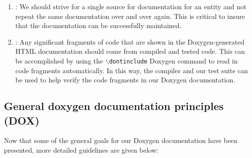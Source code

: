 \begin{enumerate}
{}\item\DOXGDoNotRepeat: We should strive for a single source for
documentation for an entity and not repeat the same documentation over and
over again.  This is critical to insure that the documentation can be
successfully maintained.

{}\item\DOXGDocumentationMaintainItself: Any significant fragments of code
that are shown in the Doxygen-generated HTML documentation should come from
compiled and tested code.  This can be accomplished by using the
{}\texttt{$\backslash$dontinclude} Doxygen command to read in code fragments
automatically.  In this way, the compiler and our test suite can be used to
help verify the code fragments in our Doxygen documentation.

\end{enumerate}

%
\subsection{General doxygen documentation principles (DOX)}
%

Now that some of the general goals for our Doxygen documentation have been
presented, more detailed guidelines are given below:

